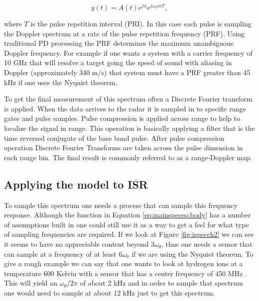\begin{equation}
\label{pdpulse}
y(t) =  A(t)e^{j\phi}e^{j\omega_dmT},
\end{equation}

\noindent where $T$ is the pulse repetition interval (PRI).  In this case each pulse is sampling the Doppler spectrum at a rate of the pulse repetition frequency (PRF).  Using traditional PD processing the PRF determines the maximum unambiguous Doppler frequency.  For example if one wants a system with a carrier frequency of 10 GHz that will resolve a target going the speed of sound with aliasing in Doppler (approximately 340 m/s) that system must have a PRF greater than 45 kHz if one uses the Nyquist theorem.   

To get the final measurement of this spectrum often a Discrete Fourier transform is applied.  When the data arrives to the radar it is sampled in to specific range gates and pulse samples.  Pulse compression is applied across range to help to localize the signal in range.  This operation is basically applying a filter that is the time reversed conjugate of the base band pulse.  After pulse compression operation Discrete Fourier Transforms are taken across the pulse dimension in each range bin.   The final result is commonly referred to as a range-Doppler map.


\subsection{Applying the model to ISR}

To sample this spectrum one needs a process that can sample this frequency response.  Although the function in Equation \ref{eq:mainspeceq:body} has a number of assumptions built in one could still use it as a way to get a feel for what type of sampling frequencies are required.  If we look at Figure \ref{fig:ispecch2} we can see it seems to have no appreciable content beyond $3\omega_\theta$, thus one needs a sensor that can sample at a frequency of at least $6\omega_\theta$ if we are using the Nyquist theorem.  To give a rough example we can say that one wants to look at hydrogen ions at a  temperature 600 Kelvin with a sensor that has a center frequency of 450 MHz \footnotemark[1].  This will yield an $\omega_\theta/2\pi$ of about 2 kHz and in order to sample that spectrum one would need to sample at about 12 kHz just to get this spectrum.
  


